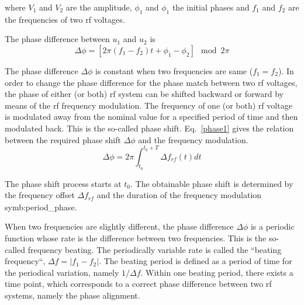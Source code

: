 where $V_1$ and $V_2$ are the amplitude, $\phi_1$ and $\phi_1$ the initial phases and $f_1$ and $f_2$ are the frequencies of two rf voltages. 


The phase difference between $u_1$ and $u_2$ is
\begin{equation}
	\Delta \phi=[2\pi(f_1-f_2)t+\phi_1-\phi_2] \mod 2\pi\label{phase_diff_general}
\end{equation}

The phase difference $\Delta \phi$ is constant when two frequencies are same ($f_1=f_2$). In order to change the phase difference for the phase match between two rf voltages, the phase of either (or both) rf system can be shifted backward or forward by means of the rf frequency modulation. The frequency of one (or both) rf voltage is modulated away from the nominal value for a specified period of time and then modulated back. This is the so-called phase shift. Eq.~\ref{phase1} gives the relation between the required phase shift $\Delta \phi$ and the frequency modulation. 
\begin{equation}
\Delta \phi= 2\pi \int_{t_0}^{t_0+T} \Delta f_\mathit{rf}(t)dt \label{phase1}
\end{equation}

The phase shift process starts at $t_0$. The obtainable phase shift is determined by the frequency offset $\Delta f_\mathit{rf}$ and the duration of the frequency modulation \gls{symb:period_phase}. 

When two frequencies are slightly different, the phase difference $\Delta \phi$ is a periodic function whose rate is the difference between two frequencies. This is the so-called frequency beating. The periodically variable rate is called the ``beating frequency``, $\Delta f=|f_1-f_2|$. The beating period is defined as a period of time for the periodical variation, namely $1/\Delta f$. Within one beating period, there exists a time point, which corresponds to a correct phase difference between two rf systems, namely the phase alignment. 

